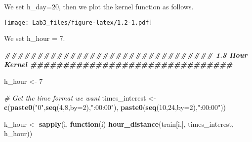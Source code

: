 \documentclass[
]{article}
\newenvironment{Shaded}{\begin{snugshade}}{\end{snugshade}}
\newcommand{\AttributeTok}[1]{\textcolor[rgb]{0.13,0.29,0.53}{#1}}
\newcommand{\CommentTok}[1]{\textcolor[rgb]{0.56,0.35,0.01}{\textit{#1}}}
\newcommand{\ControlFlowTok}[1]{\textcolor[rgb]{0.13,0.29,0.53}{\textbf{#1}}}
\newcommand{\DecValTok}[1]{\textcolor[rgb]{0.00,0.00,0.81}{#1}}
\newcommand{\DocumentationTok}[1]{\textcolor[rgb]{0.56,0.35,0.01}{\textbf{\textit{#1}}}}
\newcommand{\FunctionTok}[1]{\textcolor[rgb]{0.13,0.29,0.53}{\textbf{#1}}}
\newcommand{\NormalTok}[1]{#1}
\newcommand{\OtherTok}[1]{\textcolor[rgb]{0.56,0.35,0.01}{#1}}
\newcommand{\SpecialCharTok}[1]{\textcolor[rgb]{0.81,0.36,0.00}{\textbf{#1}}}
\newcommand{\StringTok}[1]{\textcolor[rgb]{0.31,0.60,0.02}{#1}}
\begin{document}
We set h\_day=20, then we plot the kernel function as follows.

\begin{Shaded}
\end{Shaded}

\texttt{[image: Lab3\_files/figure-latex/1.2-1.pdf]}

We set h\_hour = 7.

\begin{Shaded}
\begin{Highlighting}[]
\DocumentationTok{\#\#\#\#\#\#\#\#\#\#\#\#\#\#\#\#\#\#\#\#\#\#\#\#\#\#\#\#\#\#\#\# 1.3 Hour Kernel \#\#\#\#\#\#\#\#\#\#\#\#\#\#\#\#\#\#\#\#\#\#\#\#\#\#\#\#\#\#\#}

\NormalTok{h\_hour }\OtherTok{\textless{}{-}} \DecValTok{7}

\CommentTok{\# Get the time format we want}
\NormalTok{times\_interest }\OtherTok{\textless{}{-}} \FunctionTok{c}\NormalTok{(}\FunctionTok{paste0}\NormalTok{(}\StringTok{"0"}\NormalTok{,}\FunctionTok{seq}\NormalTok{(}\DecValTok{4}\NormalTok{,}\DecValTok{8}\NormalTok{,}\AttributeTok{by=}\DecValTok{2}\NormalTok{),}\StringTok{":00:00"}\NormalTok{), }\FunctionTok{paste0}\NormalTok{(}\FunctionTok{seq}\NormalTok{(}\DecValTok{10}\NormalTok{,}\DecValTok{24}\NormalTok{,}\AttributeTok{by=}\DecValTok{2}\NormalTok{),}\StringTok{":00:00"}\NormalTok{))}

\NormalTok{k\_hour }\OtherTok{\textless{}{-}} \FunctionTok{sapply}\NormalTok{(i, }\ControlFlowTok{function}\NormalTok{(i) }\FunctionTok{hour\_distance}\NormalTok{(train[i,], times\_interest, h\_hour))}
\end{Highlighting}
\end{Shaded}
\end{document}

